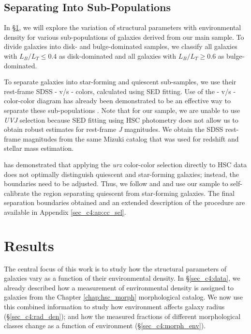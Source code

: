 \subsection{Separating Into Sub-Populations} \label{sec_c4:sep_into_subsamples}
In \S \ref{sec_c4:results}, we will explore the variation of structural parameters with environmental density for various sub-populations of galaxies derived from our main sample. To divide galaxies into disk- and bulge-dominated samples, we classify all galaxies with $L_B/L_T \leq 0.4$ as disk-dominated and all galaxies with $L_B/L_T \geq 0.6$ as bulge-dominated. 

To separate galaxies into star-forming and quiescent sub-samples, we use their rest-frame SDSS \uband{}-\rb{} v/s \rb{}-\zb{} colors, calculated using SED fitting. Use of the \uband{}-\rb{} v/s \rb{}-\zb{} color-color diagram has already been demonstrated to be an effective way to separate these sub-populations \citep[e.g.,][]{Holden12, Chang15, pozzetti_10, lopes_16, hsc_mass_size}. Note that for our sample, we are unable to use \textit{UVJ} selection because SED fitting using HSC \grizy{} photometry does not allow us to obtain robust estimates for rest-frame \textit{J} magnitudes. We obtain the SDSS rest-frame magnitudes from the same Mizuki catalog that was used for redshift and stellar mass estimation. 

\citet{hsc_mass_size} has demonstrated that applying the \citet{Holden12} \textit{urz} color-color selection directly to HSC data does not optimally distinguish quiescent and star-forming galaxies; instead, the boundaries need to be adjusted. Thus, we follow \citet{Kawin16} and \citet{hsc_mass_size} and use our sample to self-calibrate the region separating quiescent from star-forming galaxies. The final separation boundaries obtained and an extended description of the procedure are available in Appendix \ref{sec_c4:ap:cc_sel}.

\section{Results} \label{sec_c4:results}
The central focus of this work is to study how the structural parameters of galaxies vary as a function of their environmental density. In \S \ref{sec_c4:data}, we already described how a measurement of environmental density is assigned to galaxies from the Chapter \ref{chap:hsc_morph} morphological catalog. We now use this combined information to study how environment affects galaxy radius (\S \ref{sec_c4:rad_den}); and how the measured fractions of different morphological classes change as a function of environment (\S \ref{sec_c4:morph_env}).

